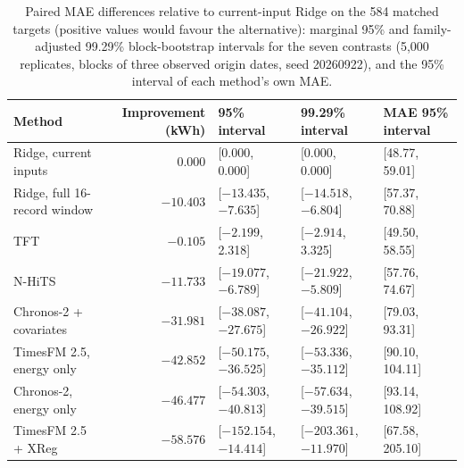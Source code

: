 \begin{table}[!htbp]\centering\footnotesize
\caption{Paired MAE differences relative to current-input Ridge on the 584 matched targets (positive values would favour the alternative): marginal 95\% and family-adjusted 99.29\% block-bootstrap intervals for the seven contrasts (5,000 replicates, blocks of three observed origin dates, seed 20260922), and the 95\% interval of each method's own MAE.}\label{tab:s_paired}
\begin{tabular}{@{}lrlll@{}}\toprule
Method & Improvement (kWh) & 95\% interval & 99.29\% interval & MAE 95\% interval \\\midrule
Ridge, current inputs & 0.000 & [0.000, 0.000] & [0.000, 0.000] & [48.77, 59.01] \\
Ridge, full 16-record window & $-10.403$ & [$-13.435$, $-7.635$] & [$-14.518$, $-6.804$] & [57.37, 70.88] \\
TFT & $-0.105$ & [$-2.199$, 2.318] & [$-2.914$, 3.325] & [49.50, 58.55] \\
N-HiTS & $-11.733$ & [$-19.077$, $-6.789$] & [$-21.922$, $-5.809$] & [57.76, 74.67] \\
Chronos-2 + covariates & $-31.981$ & [$-38.087$, $-27.675$] & [$-41.104$, $-26.922$] & [79.03, 93.31] \\
TimesFM 2.5, energy only & $-42.852$ & [$-50.175$, $-36.525$] & [$-53.336$, $-35.112$] & [90.10, 104.11] \\
Chronos-2, energy only & $-46.477$ & [$-54.303$, $-40.813$] & [$-57.634$, $-39.515$] & [93.14, 108.92] \\
TimesFM 2.5 + XReg & $-58.576$ & [$-152.154$, $-14.414$] & [$-203.361$, $-11.970$] & [67.58, 205.10] \\
\bottomrule
\end{tabular}
\end{table}

